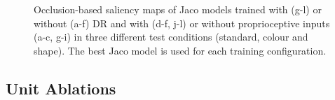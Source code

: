 \begin{figure}[h!]
\begin{subfigure}{0.24\columnwidth}
  \end{subfigure}
  \caption{Occlusion-based saliency maps of Jaco models trained with (g-l) or without (a-f) DR and with (d-f, j-l) or without proprioceptive inputs (a-c, g-i) in three different test conditions (standard, colour and shape). The best Jaco model is used for each training configuration.}
  \label{fig:saliency_jaco_distractor}
\end{figure}

\subsection{Unit Ablations}

